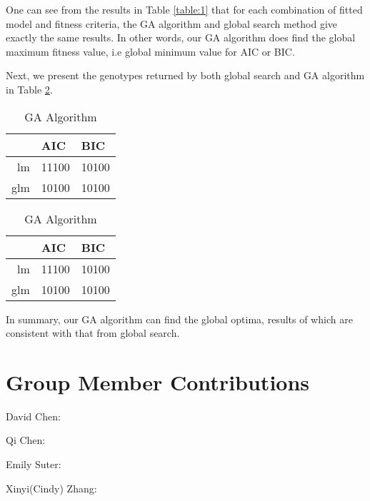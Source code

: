 \documentclass{article}
\begin{document}
\noindent
One can see from the results in Table \ref{table:1} that for each combination of fitted model and fitness criteria, the GA algorithm and global search method give exactly the same results. In other words, our GA algorithm does find the global maximum fitness value, i.e global minimum value for AIC or BIC.

\vspace{3mm}
\noindent
Next, we present the genotypes returned by both global search and GA algorithm in Table \ref{table:4}.

\begin{table}[htp]
    \centering
    \caption{Comparison of optimal fitness values with respect to global search and GA algorithm}
    \vspace{0.05in}
            \newsavebox{\tableboxc}
\begin{lrbox}{\tableboxc}
    \begin{minipage}{.5\linewidth}
      \caption{Global Search}
      \centering
       \begin{tabular}{r|l|l}
  \hline
 & AIC & BIC \\
  \hline
lm & 11100 & 10100 \\
  glm & 10100 & 10100 \\
   \hline
\end{tabular}
    \end{minipage}%
    \begin{minipage}{.5\linewidth}
      \centering
        \caption{GA Algorithm}
        \begin{tabular}{r|l|l}
  \hline
 & AIC & BIC \\
  \hline
lm & 11100 & 10100 \\
  glm & 10100 & 10100 \\
   \hline
\end{tabular}
    \end{minipage}
    \end{lrbox}
    \label{table:4}
\scalebox{1}{\usebox{\tableboxc}}
\end{table}

\noindent
In summary, our GA algorithm can find the global optima, results of which are consistent with that from global search.

\section{Group Member Contributions}\label{s4}
David Chen:

\vspace{3mm}
\noindent
Qi Chen:

\vspace{3mm}
\noindent
Emily Suter:

\vspace{3mm}
\noindent
Xinyi(Cindy) Zhang:

\nocite{selection}


\end{document}
